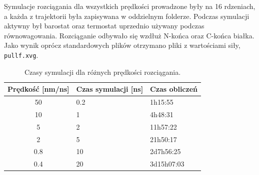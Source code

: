 Symulacje rozciągania dla wszystkich prędkości prowadzone były na 16 rdzeniach, a każda z trajektorii była zapisywana w oddzielnym folderze. Podczas symulacji aktywny był barostat oraz termostat uprzednio używany podczas równowagowania. Rozciąganie odbywało się wzdłuż N-końca oraz C-końca białka. Jako wynik oprócz standardowych plików otrzymano pliki z wartościami siły, \texttt{pullf.xvg}.

\begin{center}
\begin{table}[h]
\centering
  \begin{tabular}{| c | l | l |}
  \hline
  Prędkość [nm/ns] & Czas symulacji [ns] & Czas obliczeń\\
  \hline
  50 & 0.2 & 1h15:55 \\
  10 & 1 & 4h48:31 \\
  5 & 2 & 11h57:22 \\
  2 & 5 & 21h50:17 \\
  0.8 & 10 & 2d7h56:25 \\
  0.4 & 20 & 3d15h07:03\\
  \hline
  \end{tabular}
  \caption{Czasy symulacji dla różnych prędkości rozciągania.}
\end{table}
\end{center}

